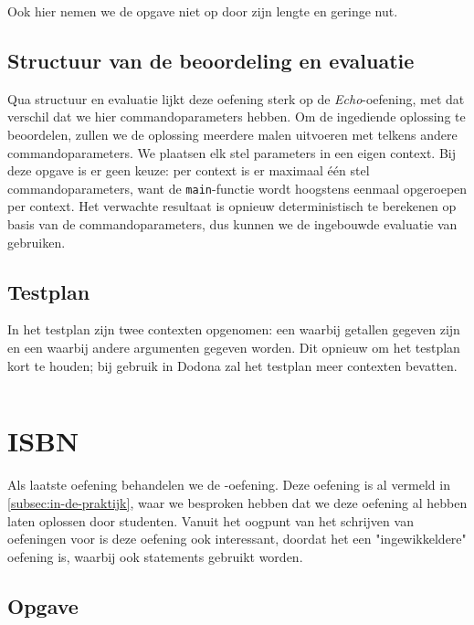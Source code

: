 Ook hier nemen we de opgave niet op door zijn lengte en geringe nut.

\subsection{Structuur van de beoordeling en evaluatie}\label{subsec:oefening-som-structuur}

Qua structuur en evaluatie lijkt deze oefening sterk op de \emph{Echo}-oefening, met dat verschil dat we hier commandoparameters hebben.
Om de ingediende oplossing te beoordelen, zullen we de oplossing meerdere malen uitvoeren met telkens andere commandoparameters.
We plaatsen elk stel parameters in een eigen context.
Bij deze opgave is er geen keuze: per context is er maximaal één stel commandoparameters, want de \texttt{main}-functie wordt hoogstens eenmaal opgeroepen per context.
Het verwachte resultaat is opnieuw deterministisch te berekenen op basis van de commandoparameters, dus kunnen we de ingebouwde evaluatie van \tested{} gebruiken.

\subsection{Testplan}\label{subsec:oefening-som-testplan}

In het testplan zijn twee contexten opgenomen: een waarbij getallen gegeven zijn en een waarbij andere argumenten gegeven worden.
Dit opnieuw om het testplan kort te houden;
bij gebruik in Dodona zal het testplan meer contexten bevatten.

\inputminted{json}{sources/sum-plan.tson}

\section{ISBN}\label{sec:oefening-isbn}

Als laatste oefening behandelen we de \emph{}-oefening.
Deze oefening is al vermeld in \cref{subsec:in-de-praktijk}, waar we besproken hebben dat we deze oefening al hebben laten oplossen door studenten.
Vanuit het oogpunt van het schrijven van oefeningen voor \tested{} is deze oefening ook interessant, doordat het een "ingewikkeldere" oefening is, waarbij ook statements gebruikt worden.

\subsection{Opgave}\label{subsec:oefeningen-isbn-opgave}

